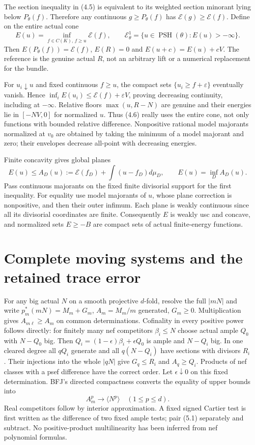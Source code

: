 \documentclass[10pt]{article}
\newcommand{\PSH}{\operatorname{PSH}}
\newcommand{\EE}{\mathcal E^1_\theta}
\begin{document}
The section inequality in (4.5) is equivalent to its weighted section
minorant lying below $P_\theta(f)$. Therefore any continuous
$g\geq P_\theta(f)$ has $\mathscr E(g)\geq\mathscr E(f)$.
Define on the entire actual cone
\[
 E(u)=\inf_{f\in C(K),\,f\geq u}\mathscr E(f),\qquad
 \EE=\{u\in\PSH(\theta):E(u)>-\infty\}.
 \tag{4.6}
\]
Then $E(P_\theta(f))=\mathscr E(f)$, $E(R)=0$ and
$E(u+c)=E(u)+cV$. The reference is the genuine actual $R$, not an
arbitrary lift or a numerical replacement for the bundle.

For $u_i\downarrow u$ and fixed continuous $f\geq u$, the compact
sets $\{u_i\geq f+\varepsilon\}$ eventually vanish. Hence
$\inf_i E(u_i)\leq\mathscr E(f)+\varepsilon V$, proving decreasing
continuity, including at $-\infty$. Relative floors $\max(u,R-N)$
are genuine and their energies lie in $[-NV,0]$ for normalized $u$.
Thus (4.6) really uses the entire cone, not only functions with bounded
relative difference. Nonpositive rational model majorants normalized at
$v_0$ are obtained by taking the minimum of a model majorant and zero;
their envelopes decrease all-point with decreasing energies.

Finite concavity gives global planes
\[
 E(u)\leq A_D(u):=\mathscr E(f_D)+\int(u-f_D)d\mu_D,
 \qquad E(u)=\inf_D A_D(u).
 \tag{4.7}
\]
Pass continuous majorants on the fixed finite divisorial support for the
first inequality. For equality use model majorants of $u$, whose plane
correction is nonpositive, and then their outer infimum. Each plane is
weakly continuous since all its divisorial coordinates are finite.
Consequently $E$ is weakly usc and concave, and normalized sets
$E\geq-B$ are compact sets of actual finite-energy functions.

\section{Complete moving systems and the retained trace error}
For any big actual $N$ on a smooth projective $d$-fold, resolve the full
$|mN|$ and write $p_m^*(mN)=M_m+G_m$, $A_m=M_m/m$ generated,
$G_m\geq0$. Multiplication gives $A_{m\ell}\geq A_m$ on common
determinations. Cofinality in every positive power follows directly:
for finitely many nef competitors $\beta_i\leq N$ choose actual ample
$Q_0$ with $N-Q_0$ big. Then $Q_i=(1-\epsilon)\beta_i+\epsilon Q_0$
is ample and $N-Q_i$ big. In one cleared degree all $qQ_i$ generate
and all $q(N-Q_i)$ have sections with divisors $R_i$. Their injections
into the whole $|qN|$ give $G_q\leq R_i$ and $A_q\geq Q_i$.
Products of nef classes with a psef difference have the correct order.
Let $\epsilon\downarrow0$ on this fixed determination. BFJ's directed
compactness converts the equality of upper bounds into
\[
 A_m^p\longrightarrow\langle N^p\rangle\quad(1\leq p\leq d).
 \tag{5.1}
\]
Real competitors follow by interior approximation. A fixed signed
Cartier test is first written as the difference of two fixed ample tests;
pair (5.1) separately and subtract. No positive-product multilinearity
has been inferred from nef polynomial formulas.
\end{document}
